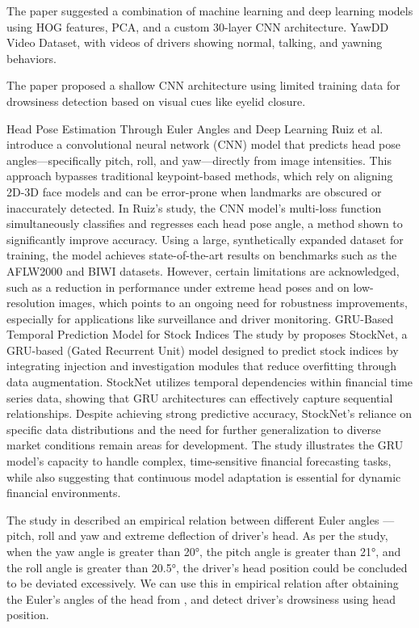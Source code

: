 The paper \cite{ramzan2024} suggested a combination of machine learning and deep learning models using HOG features, PCA, and a custom 30-layer CNN architecture. YawDD Video Dataset, with videos of drivers showing normal, talking, and yawning behaviors.

The paper \cite{venkateswarlu2024} proposed a shallow CNN architecture using limited training data for drowsiness detection based on visual cues like eyelid closure.

Head Pose Estimation Through Euler Angles and Deep Learning Ruiz et al. \cite{ruiz2018} introduce a convolutional neural network (CNN) model that predicts head pose angles—specifically pitch, roll, and yaw—directly from image intensities. This approach bypasses traditional keypoint-based methods, which rely on aligning 2D-3D face models and can be error-prone when landmarks are obscured or inaccurately detected. In Ruiz’s study, the CNN model’s multi-loss function simultaneously classifies and regresses each head pose angle, a method shown to significantly improve accuracy. Using a large, synthetically expanded dataset for training, the model achieves state-of-the-art results on benchmarks such as the AFLW2000 and BIWI datasets.
However, certain limitations are acknowledged, such as a reduction in performance under extreme head poses and on low-resolution images, which points to an ongoing need for robustness improvements, especially for applications like surveillance and driver monitoring.
GRU-Based Temporal Prediction Model for Stock Indices The study by \cite{ruiz2018} proposes StockNet, a GRU-based (Gated Recurrent Unit) model designed to predict stock indices by integrating injection and investigation modules that reduce overfitting through data augmentation.
StockNet utilizes temporal dependencies within financial time series data, showing that GRU architectures can effectively capture sequential relationships. Despite achieving strong predictive accuracy, StockNet’s reliance on specific data distributions and the need for further generalization to diverse market conditions remain areas for development. The study illustrates the GRU model's capacity to handle complex, time-sensitive financial forecasting tasks, while also suggesting that continuous model adaptation is essential for dynamic financial environments.

The study in \cite{ye2021} described an empirical relation between different Euler angles --- pitch, roll and yaw and extreme deflection of driver's head. As per the study, when the yaw angle is greater than 20°, the pitch angle is greater than 21°, and the roll angle is greater than 20.5°, the driver’s head position could be concluded to be deviated excessively.
We can use this in empirical relation after obtaining the Euler's angles of the head from \cite{ruiz2018}, and detect driver's drowsiness using head position.